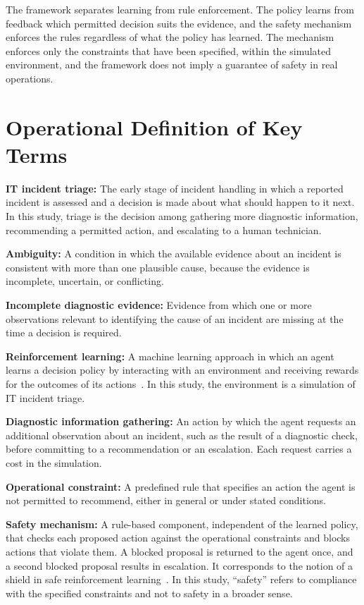 \documentclass[12pt,a4paper]{article}
\begin{document}
The framework separates learning from rule enforcement. The policy learns from feedback which permitted decision suits the evidence, and the safety mechanism enforces the rules regardless of what the policy has learned. The mechanism enforces only the constraints that have been specified, within the simulated environment, and the framework does not imply a guarantee of safety in real operations.

\section{Operational Definition of Key Terms}

\textbf{IT incident triage:} The early stage of incident handling in which a reported incident is assessed and a decision is made about what should happen to it next. In this study, triage is the decision among gathering more diagnostic information, recommending a permitted action, and escalating to a human technician.

\textbf{Ambiguity:} A condition in which the available evidence about an incident is consistent with more than one plausible cause, because the evidence is incomplete, uncertain, or conflicting.

\textbf{Incomplete diagnostic evidence:} Evidence from which one or more observations relevant to identifying the cause of an incident are missing at the time a decision is required.

\textbf{Reinforcement learning:} A machine learning approach in which an agent learns a decision policy by interacting with an environment and receiving rewards for the outcomes of its actions~\cite{sutton2018}. In this study, the environment is a simulation of IT incident triage.

\textbf{Diagnostic information gathering:} An action by which the agent requests an additional observation about an incident, such as the result of a diagnostic check, before committing to a recommendation or an escalation. Each request carries a cost in the simulation.

\textbf{Operational constraint:} A predefined rule that specifies an action the agent is not permitted to recommend, either in general or under stated conditions.

\textbf{Safety mechanism:} A rule-based component, independent of the learned policy, that checks each proposed action against the operational constraints and blocks actions that violate them. A blocked proposal is returned to the agent once, and a second blocked proposal results in escalation. It corresponds to the notion of a shield in safe reinforcement learning~\cite{alshiekh2018}. In this study, ``safety'' refers to compliance with the specified constraints and not to safety in a broader sense.
\end{document}
